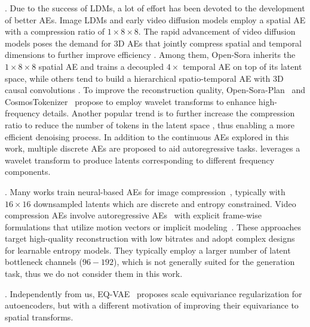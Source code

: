 .
Due to the success of LDMs, a lot of effort has been devoted to the development of better AEs. 
Image LDMs \cite{LDM} and early video diffusion models \cite{SVD,AnimateDiff} employ a spatial AE with a compression ratio of $1{\times}8{\times}8$. 
The rapid advancement of video diffusion models poses the demand for 3D AEs that jointly compress spatial and temporal dimensions to further improve efficiency \cite{CogVideo,zhou2024allegro,HunyuanVideo}. 
Among them, Open-Sora \cite{opensora} inherits the $1{\times}8{\times}8$ spatial AE and trains a decoupled $4{\times}$ temporal AE on top of its latent space, while others tend to build a hierarchical spatio-temporal AE with 3D causal convolutions \cite{xing2024videovaeplus,wu2024ivvae,chen2024deep,zhao2024cvvae,sadat2024litevae,hansen2025vitok}. 
To improve the reconstruction quality, Open-Sora-Plan~\cite{opensoraplan} and CosmosTokenizer~\cite{CosmosTokenizer} propose to employ wavelet transforms to enhance high-frequency details. 
Another popular trend is to further increase the compression ratio to reduce the number of tokens in the latent space \cite{xie2024sana,tian2024reducio,LTX-video}, thus enabling a more efficient denoising process. 
In addition to the continuous AEs explored in this work, multiple discrete AEs \cite{wang2024omnitokenizer,tang2024vidtok,CosmosTokenizer} are proposed to aid autoregressive tasks. \citet{esteves2024spectral} leverages a wavelet transform to produce latents corresponding to different frequency components. %

.
Many works train neural-based AEs for image compression~\cite{balle2016end,balle2018variational,minnen2018joint,cheng2020learned}, typically with $16{\times}16$ downsampled latents which are discrete and entropy constrained.
Video compression AEs involve autoregressive AEs~\cite{DCVC,DCVC-DC,DCVC-TCM} with explicit frame-wise 
formulations that utilize motion vectors or implicit modeling~\cite{VCT}.
These approaches target high-quality reconstruction with low bitrates and adopt complex designs for learnable entropy models.
They typically employ a larger number of latent bottleneck channels ($96{-}192$), which is not generally suited for the generation task, thus we do not consider them in this work.

.
Independently from us, EQ-VAE~\citep{EQVAE} proposes scale equivariance regularization for autoencoders, but with a different motivation of improving their equivariance to spatial transforms.

